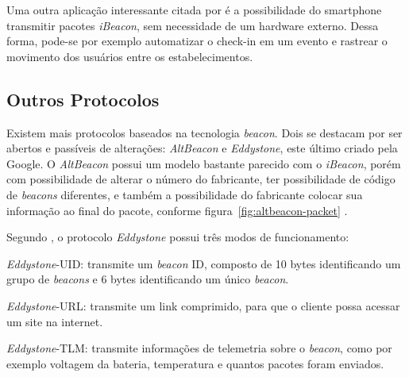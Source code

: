 \documentclass[
	12pt,				%
	openright,			%
	oneside,			%
	a4paper,			%
	chapter=TITLE,		%
	english,			%
	brazil				%
	]{abntex2}
\begin{document}
{Uma outra aplicação interessante citada por  é a possibilidade do smartphone transmitir pacotes \textit{iBeacon}, sem necessidade de um hardware externo. Dessa forma, pode-se por exemplo automatizar o check-in em um evento e rastrear o movimento dos usuários entre os estabelecimentos.

\subsection{Outros Protocolos}

Existem mais protocolos baseados na tecnologia \textit{beacon}. Dois se destacam por ser abertos e passíveis de alterações: \textit{AltBeacon} e \textit{Eddystone}, este último criado pela Google. O \textit{AltBeacon} possui um modelo bastante parecido com o \textit{iBeacon}, porém com possibilidade de alterar o número do fabricante, ter possibilidade de código de \textit{beacons} diferentes, e também a possibilidade do fabricante colocar sua informação ao final do pacote, conforme figura~\ref{fig:altbeacon-packet} \cite{arm-beacons}.

\begin{figure}[htb]
\end{figure}

Segundo , o protocolo \textit{Eddystone} possui três modos de funcionamento:
\begin{alineas}
	\item \textit{Eddystone}-UID: transmite um \textit{beacon} ID, composto de 10 bytes identificando um grupo de \textit{beacons} e  6 bytes identificando um único \textit{beacon}.
	\item \textit{Eddystone}-URL: transmite um link comprimido, para que o cliente possa acessar um site na internet.
	\item \textit{Eddystone}-TLM: transmite informações de telemetria sobre o \textit{beacon}, como por exemplo voltagem da bateria, temperatura e quantos pacotes foram enviados.
\end{alineas}

}
\end{document}
